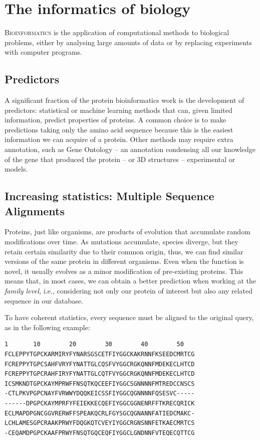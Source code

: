 \chapter{The informatics of biology}
\lettrine[lines=3, lhang=0.3, nindent=0em]{\color{Maroon}B}{ioinformatics}
is the application of computational methods to biological problems,
either by analysing large amounts of data or by replacing experiments with computer programs.

\section{Predictors}
A significant fraction of the protein bioinformatics work is the development of predictors: statistical or machine learning methods that can, given limited information, predict properties of proteins.
A common choice is to make predictions taking only the amino acid sequence because this is the easiest information we can acquire of a protein.
Other methods may require extra annotation, such as Gene Ontology -- an annotation condensing all our knowledge of the gene that produced the protein -- or 3D structures -- experimental or models.

\section[Multiple Sequence Alignments]{Increasing statistics: Multiple Sequence Alignments}
Proteins, just like organisms, are products of evolution that accumulate random modifications over time.
As mutations accumulate, species diverge, but they retain certain similarity due to their common origin, thus, we can find similar versions of the same protein in different organisms.
Even when the function is novel, it usually evolves as a minor modification of pre-existing proteins.
This means that, in most cases, we can obtain a better prediction when working at the \emph{family level,}
i.e., considering not only our protein of interest but also any related sequence in our database.

To have coherent statistics, every sequence must be aligned to the original query, as in the following example:

\begin{center}
\marginpar{\phantom{x}}
\marginpar{\phantom{x}}
\marginpar{\phantom{x}}
\begin{Verbatim}[fontsize=\small, xleftmargin=3em]
1       10        20        30        40        50   
FCLEPPYTGPCKARMIRYFYNARSGSCETFIYGGCKAKRNNFKSEEDCMRTCG
FCREPPYTGPCSAHFVRYFYNATTGLCQSFVYGGCRGKQNNFMDEKECLHTCD
FCREPPYTGPCRAHFIRYFYNATTGLCQTFVYGGCRGKQNNFMDEKECLHTCD
ICSMKNDTGPCKAYMPRWFFNSQTKQCEEFIYGGCSGNNNNFMTREDCCNSCS
-CTLPKVPGPCNAYFVRWWYDQQKEICSSFIYGGCQGNNNNFQSESVC-----
------DPGPCKAYMPRFYFEIEKKECQEFIYGGCGGNENRFFTKRECQRICK
ECLMAPDPGNCGGVRERWFFSPEAKQCRLFGYSGCQGNANNFATIEDCMAKC-
LCHLAMESGPCRAAKPRWYFDQGKQTCVEYIYGGCRGNSNNFETKAECMRTCS
-CEQAMDPGPCKAAFPRWYFNSQTGQCEQFIYGGCLGNDNNFVTEQECQTTCG
\end{Verbatim}
\end{center}


